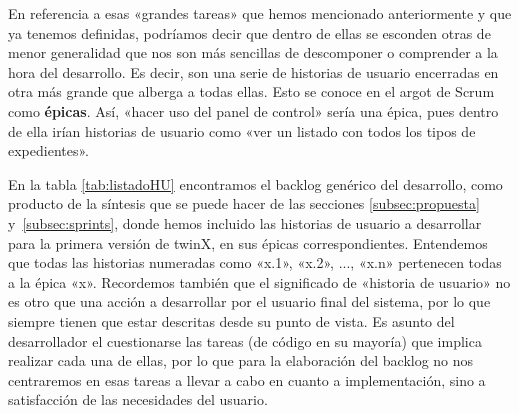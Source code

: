 En referencia a esas «grandes tareas» que hemos mencionado anteriormente y que ya tenemos definidas, podríamos decir que dentro de ellas se esconden otras de menor generalidad que nos son más sencillas de descomponer o comprender a la hora del desarrollo. Es decir, son una serie de historias de usuario encerradas en otra más grande que alberga a todas ellas. Esto se conoce en el argot de Scrum como \textbf{épicas}. Así, «hacer uso del panel de control» sería una épica, pues dentro de ella irían historias de usuario como «ver un listado con todos los tipos de expedientes».

En la tabla \ref{tab:listadoHU} encontramos el backlog genérico del desarrollo, como producto de la síntesis que se puede hacer de las secciones \ref{subsec:propuesta} y~\ref{subsec:sprints}, donde hemos incluido las historias de usuario a desarrollar para la primera versión de twinX, en sus épicas correspondientes. Entendemos que todas las historias numeradas como «x.1», «x.2», ..., «x.n» pertenecen todas a la épica «x». Recordemos también que el significado de «historia de usuario» no es otro que una acción a desarrollar por el usuario final del sistema, por lo que siempre tienen que estar descritas desde su punto de vista. Es asunto del desarrollador el cuestionarse las tareas (de código en su mayoría) que implica realizar cada una de ellas, por lo que para la elaboración del backlog no nos centraremos en esas tareas a llevar a cabo en cuanto a implementación, sino a satisfacción de las necesidades del usuario.

